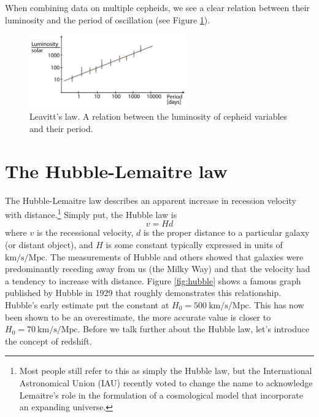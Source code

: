 \documentclass[a4paper,12pt]{article}
\theoremstyle{remark}
\newcommand{\mrm}[1]{\mathrm{#1}}
\renewcommand{\=}[1]{\stackrel{#1}{=}} %
\theoremstyle{plain}
\theoremstyle{definition}
\begin{document}
When combining data on multiple cepheids, we see a clear relation between their luminosity and the period of oscillation (see Figure \ref{fig:lr}).

\begin{figure}[t]
\begin{center}
    \includegraphics*[angle=0,width=0.6\textwidth]{img/luminosity_relation.png}
    \caption[Insert text]{Leavitt's law. A relation between the luminosity of cepheid variables and their period.}
\label{fig:lr}
\end{center}
\end{figure}

\section{The Hubble-Lemaitre law}
The Hubble-Lemaitre law describes an apparent increase in recession velocity with distance.\footnote{Most people still refer to this as simply the Hubble law, but the International Astronomical Union (IAU) recently voted to change the name to acknowledge Lemaitre's role in the formulation of a cosmological model that incorporate an expanding universe.} Simply put, the Hubble law is
\begin{equation}
v = H d
\end{equation}
where $v$ is the recessional velocity, $d$ is the proper distance to a particular galaxy (or distant object), and $H$ is some constant typically expressed in units of $\mrm{km /  s / Mpc}$. The measurements of Hubble and others showed that galaxies were predominantly receding away from us (the Milky Way) and that the velocity had a tendency to increase with distance. Figure \ref{fig:hubble} shows a famous graph published by Hubble in 1929 that roughly demonstrates this relationship. Hubble's early estimate put the constant at $H_0 = 500 \: \mrm{km /  s / Mpc}$. This has now been shown to be an overestimate, the more accurate value is closer to $H_0 = 70 \:\mrm{km /  s / Mpc}$. Before we talk further about the Hubble law, let's introduce the concept of redshift. 
\end{document}
